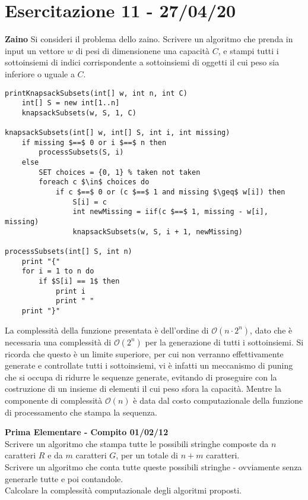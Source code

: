 \documentclass[../cheatSheetAlgoritmi.tex]{subfiles}
\begin{document}
\section{Esercitazione 11 - 27/04/20}
\textbf{Zaino}
Si consideri il problema dello zaino. Scrivere un algoritmo che prenda in input un vettore $w$ di pesi di dimensionene una capacità $C$, e stampi tutti i sottoinsiemi di indici corrispondente a sottoinsiemi di oggetti il cui peso sia inferiore o uguale a $C$.
\begin{lstlisting}[caption=Stampa i subsets di Knapsack]
printKnapsackSubsets(int[] w, int n, int C)
    int[] S = new int[1..n]
    knapsackSubsets(w, S, 1, C)

knapsackSubsets(int[] w, int[] S, int i, int missing)
    if missing $==$ 0 or i $==$ n then
        processSubsets(S, i)
    else 
        SET choices = {0, 1} % taken not taken
        foreach c $\in$ choices do
            if c $==$ 0 or (c $==$ 1 and missing $\geq$ w[i]) then
                S[i] = c
                int newMissing = iif(c $==$ 1, missing - w[i], missing)
                knapsackSubsets(w, S, i + 1, newMissing)
                
processSubsets(int[] S, int n) 
    print "{"
    for i = 1 to n do
        if $S[i] == 1$ then
            print i
            print " "
    print "}"
\end{lstlisting}
La complessità della funzione presentata è dell'ordine di $\mathcal{O}(n \cdot 2^n)$, dato che è necessaria una complessità di $\mathcal{O}(2^n)$ per la generazione di tutti i sottoinsiemi. Si ricorda che questo è un limite superiore, per cui non verranno effettivamente generate e controllate tutti i sottoinsiemi, vi è infatti un meccanismo di puning che si occupa di ridurre le sequenze generate, evitando di proseguire con la costruzione di un insieme di elementi il cui peso sfora la capacità. Mentre la componente di complessità $\mathcal{O}(n)$ è data dal costo computazionale della funzione di processamento che stampa la sequenza.

\bigskip
\textbf{Prima Elementare - Compito 01/02/12}\\
Scrivere un algoritmo che stampa tutte le possibili stringhe composte da $n$ caratteri $R$ e da $m$ caratteri $G$, per un totale di $n+m$ caratteri.\\
Scrivere un algoritmo che conta tutte queste possibili stringhe - ovviamente senza generarle tutte e poi contandole.\\
Calcolare la complessità computazionale degli algoritmi proposti.
 
\end{document}
